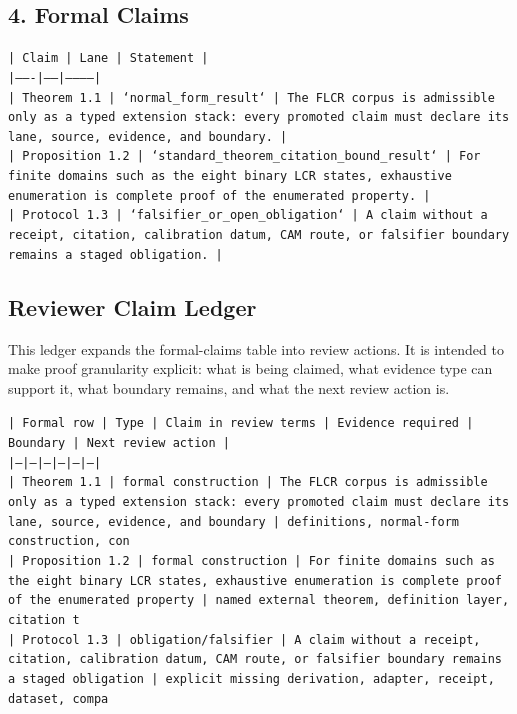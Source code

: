 \documentclass[11pt]{article}
\begin{document}
\subsection*{4. Formal Claims}

\noindent\texttt{| Claim | Lane | Statement |}\\
\noindent\texttt{|-------|------|-----------|}\\
\noindent\texttt{| Theorem 1.1 | `normal\_form\_result` | The FLCR corpus is admissible only as a typed extension stack: every promoted claim must declare its lane, source, evidence, and boundary. |}\\
\noindent\texttt{| Proposition 1.2 | `standard\_theorem\_citation\_bound\_result` | For finite domains such as the eight binary LCR states, exhaustive enumeration is complete proof of the enumerated property. |}\\
\noindent\texttt{| Protocol 1.3 | `falsifier\_or\_open\_obligation` | A claim without a receipt, citation, calibration datum, CAM route, or falsifier boundary remains a staged obligation. |}\\

\subsection*{Reviewer Claim Ledger}

This ledger expands the formal-claims table into review actions. It is intended to make proof granularity explicit: what is being claimed, what evidence type can support it, what boundary remains, and what the next review action is.

\noindent\texttt{| Formal row | Type | Claim in review terms | Evidence required | Boundary | Next review action |}\\
\noindent\texttt{|---|---|---|---|---|---|}\\
\noindent\texttt{| Theorem 1.1 | formal construction | The FLCR corpus is admissible only as a typed extension stack: every promoted claim must declare its lane, source, evidence, and boundary | definitions, normal-form construction, con}\\
\noindent\texttt{| Proposition 1.2 | formal construction | For finite domains such as the eight binary LCR states, exhaustive enumeration is complete proof of the enumerated property | named external theorem, definition layer, citation t}\\
\noindent\texttt{| Protocol 1.3 | obligation/falsifier | A claim without a receipt, citation, calibration datum, CAM route, or falsifier boundary remains a staged obligation | explicit missing derivation, adapter, receipt, dataset, compa}\\
\end{document}
